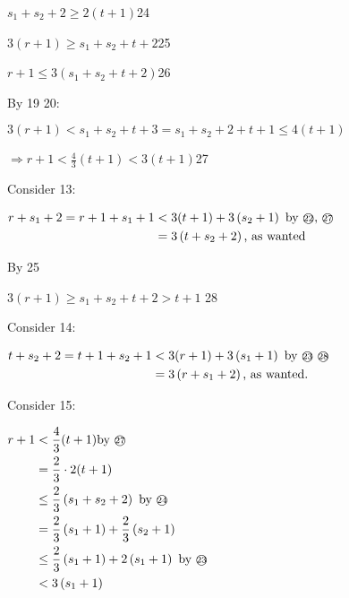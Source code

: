 \documentclass[12pt]{article}
\begin{document}
$ s_{1}+s_{2}+2 \geq 2(t+1) ${\small\textcircled{\scriptsize{24}}}

$ 3(r+1) \geq s_{1}+s_{2}+t+2${\small\textcircled{\scriptsize{25}}}

$ r+1 \leq 3\left(s_{1}+s_{2}+t+2\right) ${\small\textcircled{\scriptsize{26}}}

By {\small\textcircled{\scriptsize{19}}} {\small\textcircled{\scriptsize{20}}}: 

$ 3(r+1)<s_{1}+s_{2}+t+3=s_{1}+s_{2}+2+t+1 \leq 4(t+1) $

$ \Rightarrow r+1<\frac{4}{3}(t+1)<3(t+1)${\small\textcircled{\scriptsize{27}}}

Consider {\small\textcircled{\scriptsize{13}}}:

$
\begin{aligned}
r+ s_{1}+2=r+1+s_{1}+1 & <3(t+1)+3\left(s_{2}+1\right) \text { by {\small\textcircled{\scriptsize{22}}}, {\small\textcircled{\scriptsize{27}}} } \\
& =3\left(t+s_{2}+2\right) \text {, as wanted }
\end{aligned}
$

By {\small\textcircled{\scriptsize{25}}}

$3(r+1) \geqslant s_{1}+s_{2} + t+2>t+1$ {\small\textcircled{\scriptsize{28}}}

Consider {\small\textcircled{\scriptsize{14}}}:

$\begin{aligned}
t+s_{2}+2=t+1+s_{2}+1 & <3(r+1)+3\left(s_{1}+1\right) \text { by {\small\textcircled{\scriptsize{23}}} {\small\textcircled{\scriptsize{28}}} } \\
& =3\left(r+s_{1}+2\right) \text {, as wanted. }
\end{aligned}$

Consider {\small\textcircled{\scriptsize{15}}}:

$
\begin{aligned}
r+1&<\frac{4}{3}(t+1)  \text{by \small\textcircled{\scriptsize{27}}}\\
& =\frac{2}{3} \cdot 2(t+1) \\
& \leq \frac{2}{3}\left(s_{1}+s_{2}+2\right) \text { by \small\textcircled{\scriptsize{24}}} \\
& =\frac{2}{3}\left(s_{1}+1\right)+\frac{2}{3}\left(s_{2}+1\right) \\
& \leq \frac{2}{3}\left(s_{1}+1\right)+2\left(s_{1}+1\right) \text { by \small\textcircled{\scriptsize{23}}} \\
& <3\left(s_{1}+1\right)
\end{aligned}
$
\end{document}
